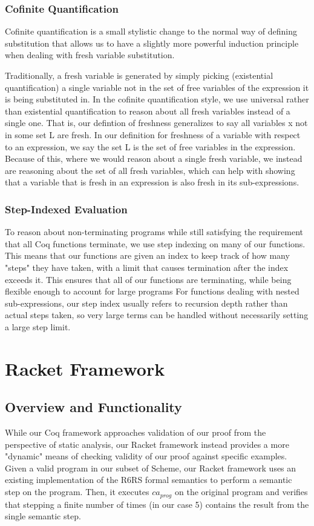 \subsubsection{Cofinite Quantification}
Cofinite quantification is a small stylistic change to the normal way of defining substitution that allows us to have a slightly more powerful induction principle when dealing with fresh variable substitution.

Traditionally, a fresh variable is generated by simply picking (existential quantification) a single variable not in the set of free variables of the expression it is being substituted in. In the cofinite quantification style, we use universal rather than existential quantification to reason about all fresh variables instead of a single one. That is, our defintion of freshness generalizes to say all variables x not in some set L are fresh. In our definition for freshness of a variable with respect to an expression, we say the set L is the set of free variables in the expression. Because of this, where we would reason about a single fresh variable, we instead are reasoning about the set of all fresh variables, which can help with showing that a variable that is fresh in an expression is also fresh in its sub-expressions.

\subsubsection{Step-Indexed Evaluation}
To reason about non-terminating programs while still satisfying the requirement that all Coq functions terminate, we use step indexing on many of our functions. This means that our functions are given an index to keep track of how many "steps" they have taken, with a limit that causes termination after the index exceeds it. This ensures that all of our functions are terminating, while being flexible enough to account for large programs For functions dealing with nested sub-expressions, our step index usually refers to recursion depth rather than actual steps taken, so very large terms can be handled without necessarily setting a large step limit.
\section{Racket Framework}
\subsection{Overview and Functionality}
While our Coq framework approaches validation of our proof from the perspective of static analysis, our Racket framework instead provides a more "dynamic" means of checking validity of our proof against specific examples. Given a valid program in our subset of Scheme, our Racket framework uses an existing implementation of the R6RS formal semantics to perform a semantic step on the program. Then, it executes $ca_{prog}$ on the original program and verifies that stepping a finite number of times (in our case 5) contains the result from the single semantic step. 

